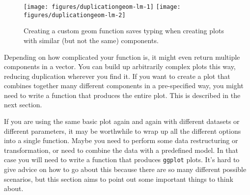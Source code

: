 \begin{figure}

{\centering \texttt{[image: figures/duplicationgeom-lm-1]} \texttt{[image: figures/duplicationgeom-lm-2]} 

}

\caption{Creating a custom geom function saves typing when creating plots with similar (but not the same) components.\label{fig:geom-lm}}
\end{figure}

Depending on how complicated your function is, it might even return
multiple components in a vector. You can build up arbitrarily complex
plots this way, reducing duplication wherever you find it. If you want
to create a plot that combines together many different components in a
pre-specified way, you might need to write a function that produces the
entire plot. This is described in the next section.


If you are using the same basic plot again and again with different
datasets or different parameters, it may be worthwhile to wrap up all
the different options into a single function. Maybe you need to perform
some data restructuring or transformation, or need to combine the data
with a predefined model. In that case you will need to write a function
that produces \texttt{ggplot} plots. It's hard to give advice on how to
go about this because there are so many different possible scenarios,
but this section aims to point out some important things to think about.
 

